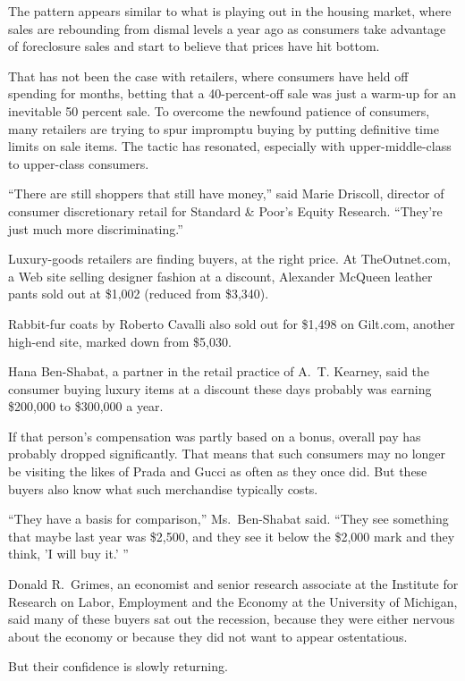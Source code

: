 ﻿\documentclass[12pt]{article}
\begin{document}
The pattern appears similar to what is playing out in the housing market, where sales are rebounding
from dismal levels a year ago as consumers take advantage of foreclosure sales and start to believe
that prices have hit bottom.

That has not been the case with retailers, where consumers have held off spending for months,
betting that a 40-percent-off sale was just a warm-up for an inevitable 50 percent sale. To overcome
the newfound patience of consumers, many retailers are trying to spur impromptu buying by putting
definitive time limits on sale items. The tactic has resonated\cite{resonate}, especially with
upper-middle-class to upper-class consumers.

``There are still shoppers that still have money,'' said Marie Driscoll, director of consumer
discretionary retail for Standard \& Poor's Equity Research. ``They're just much more
discriminating.''

Luxury-goods retailers are finding buyers, at the right price. At TheOutnet.com, a Web site selling
designer fashion at a discount, Alexander McQueen leather pants sold out at \$1,002 (reduced from
\$3,340).

Rabbit-fur coats by Roberto Cavalli also sold out for \$1,498 on Gilt.com, another high-end site,
marked down from \$5,030.

Hana Ben-Shabat, a partner in the retail practice of A.~T. Kearney, said the consumer buying luxury
items at a discount these days probably was earning \$200,000 to \$300,000 a year.

If that person's compensation was partly based on a bonus, overall pay has probably dropped
significantly. That means that such consumers may no longer be visiting the likes of Prada and Gucci
as often as they once did. But these buyers also know what such merchandise typically costs.

``They have a basis for comparison,'' Ms.~Ben-Shabat said. ``They see something that maybe last year
was \$2,500, and they see it below the \$2,000 mark and they think, 'I will buy it.' ''

Donald R.~Grimes, an economist and senior research associate at the Institute for Research on Labor,
Employment and the Economy at the University of Michigan, said many of these buyers sat out the
recession, because they were either nervous about the economy or because they did not want to appear
ostentatious\cite{ostentatious}.

But their confidence is slowly returning.
\end{document}
